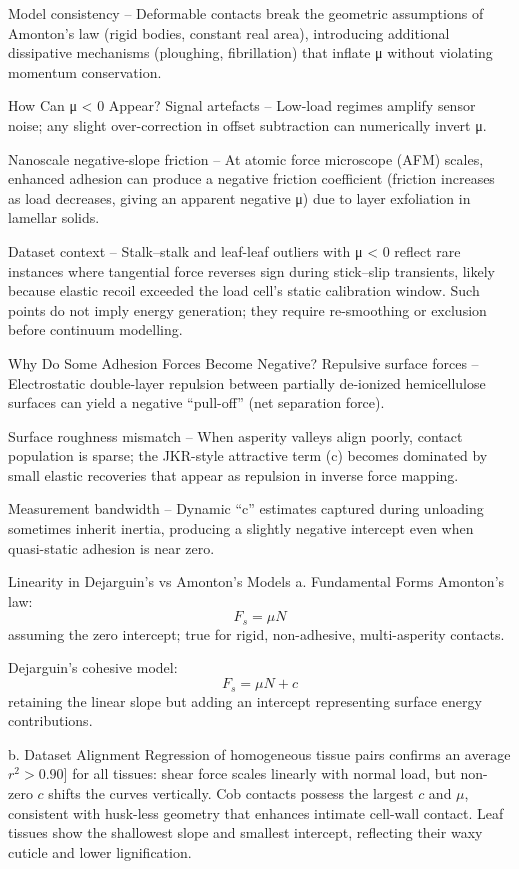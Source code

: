 \documentclass[xcolor=dvipsnames,10pt,hidelinks]{article}
\begin{document}
Model consistency – Deformable contacts break the geometric assumptions of Amonton’s law (rigid bodies, constant real area), introducing additional dissipative mechanisms (ploughing, fibrillation) that inflate μ without violating momentum conservation.

How Can μ < 0 Appear?
Signal artefacts – Low-load regimes amplify sensor noise; any slight over-correction in offset subtraction can numerically invert μ.

Nanoscale negative‐slope friction – At atomic force microscope (AFM) scales, enhanced adhesion can produce a negative friction coefficient (friction increases as load decreases, giving an apparent negative μ) due to layer exfoliation in lamellar solids.

Dataset context – Stalk–stalk and leaf-leaf outliers with μ < 0 reflect rare instances where tangential force reverses sign during stick–slip transients, likely because elastic recoil exceeded the load cell’s static calibration window. Such points do not imply energy generation; they require re-smoothing or exclusion before continuum modelling.

Why Do Some Adhesion Forces Become Negative?
Repulsive surface forces – Electrostatic double-layer repulsion between partially de-ionized hemicellulose surfaces can yield a negative “pull-off” (net separation force).

Surface roughness mismatch – When asperity valleys align poorly, contact population is sparse; the JKR-style attractive term (c) becomes dominated by small elastic recoveries that appear as repulsion in inverse force mapping.

Measurement bandwidth – Dynamic “c” estimates captured during unloading sometimes inherit inertia, producing a slightly negative intercept even when quasi-static adhesion is near zero.

Linearity in Dejarguin’s vs Amonton’s Models
a. Fundamental Forms
Amonton’s law:
\[F_s = \mu N\]
 assuming the zero intercept; true for rigid, non-adhesive, multi-asperity contacts.

Dejarguin’s cohesive model:
\[F_s = \mu N + c\]
retaining the linear slope but adding an intercept representing surface energy contributions.

b. Dataset Alignment
Regression of homogeneous tissue pairs confirms an average \(r^2 > 0.90]\) for all tissues: shear force scales linearly with normal load, but non-zero \(c\) shifts the curves vertically. Cob contacts possess the largest \(c\) and \(\mu\), consistent with husk-less geometry that enhances intimate cell-wall contact. Leaf tissues show the shallowest slope and smallest intercept, reflecting their waxy cuticle and lower lignification.
\end{document}
